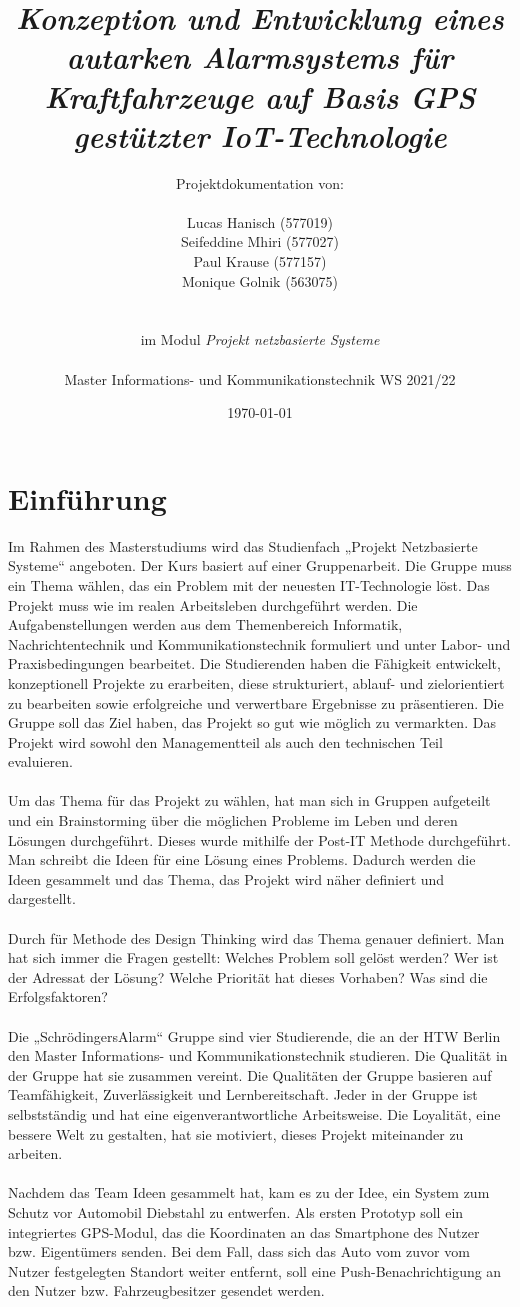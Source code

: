 \documentclass[11pt,a4paper,ngerman]{report}
\date{\today}
\title{ \textbf{\textit{Konzeption und Entwicklung eines autarken Alarmsystems für Kraftfahrzeuge auf Basis GPS gestützter IoT-Technologie}}}
\author{Projektdokumentation von: \\ \\ Lucas Hanisch (577019) \\ Seifeddine Mhiri (577027) \\ Paul Krause (577157)  \\  Monique Golnik (563075) \\ \\ \\ im Modul \textit{Projekt netzbasierte Systeme} \\ \\ Master Informations- und Kommunikationstechnik WS 2021/22 }
\begin{document}
	\maketitle
	\tableofcontents
	
\chapter{Einführung}
	
Im Rahmen des Masterstudiums wird das Studienfach „Projekt Netzbasierte Systeme“ angeboten. Der Kurs basiert auf einer Gruppenarbeit. Die Gruppe muss ein Thema wählen, das ein Problem mit der neuesten IT-Technologie löst. Das Projekt muss wie im realen Arbeitsleben durchgeführt werden. Die Aufgabenstellungen werden aus dem Themenbereich Informatik, Nachrichtentechnik und Kommunikationstechnik formuliert und unter Labor- und Praxisbedingungen bearbeitet. Die Studierenden haben die Fähigkeit entwickelt, konzeptionell Projekte zu erarbeiten, diese strukturiert, ablauf- und zielorientiert zu bearbeiten sowie erfolgreiche und verwertbare Ergebnisse zu präsentieren. Die Gruppe soll das Ziel haben, das Projekt so gut wie möglich zu vermarkten. Das Projekt wird sowohl den Managementteil als auch den technischen Teil evaluieren.\\\\
Um das Thema für das Projekt zu wählen, hat man sich in Gruppen aufgeteilt und ein Brainstorming über die möglichen Probleme im Leben und deren Lösungen durchgeführt. Dieses wurde mithilfe der Post-IT Methode durchgeführt. Man schreibt die Ideen für eine Lösung eines Problems. Dadurch werden die Ideen gesammelt und das Thema, das Projekt wird näher definiert und dargestellt. \\\\
Durch für Methode des Design Thinking wird das Thema genauer definiert. Man hat sich immer die Fragen gestellt: Welches Problem soll gelöst werden? Wer ist der Adressat der Lösung? Welche Priorität hat dieses Vorhaben? Was sind die Erfolgsfaktoren? \\\\

Die „SchrödingersAlarm“ Gruppe sind vier Studierende, die an der HTW Berlin den Master Informations- und Kommunikationstechnik studieren. Die Qualität in der Gruppe hat sie zusammen vereint. Die Qualitäten der Gruppe basieren auf Teamfähigkeit, Zuverlässigkeit und Lernbereitschaft. Jeder in der Gruppe ist selbstständig und hat eine eigenverantwortliche Arbeitsweise. Die Loyalität, eine bessere Welt zu gestalten, hat sie motiviert, dieses Projekt miteinander zu arbeiten.\\\\
Nachdem das Team Ideen gesammelt hat, kam es zu der Idee, ein System zum Schutz vor Automobil Diebstahl zu entwerfen. Als ersten Prototyp soll ein integriertes GPS-Modul, das die Koordinaten an das Smartphone des Nutzer bzw. Eigentümers senden. Bei dem Fall, dass sich das Auto vom zuvor vom Nutzer festgelegten Standort weiter entfernt, soll eine Push-Benachrichtigung an den Nutzer bzw. Fahrzeugbesitzer gesendet werden.
\end{document}
